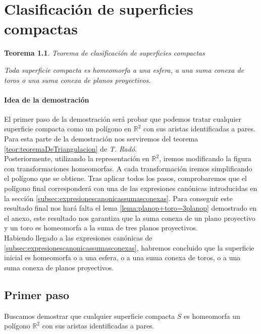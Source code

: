 \documentclass[a4paper,11pt,spanish, twoside, leqno]{tfg-uam}
\newcommand*{\reales}{\mathbb{R}}
\newtheorem{teor}{Teorema}[chapter]
\theoremstyle{definition}
\begin{document}
\chapter{Clasificación de superficies compactas}

\begin{teor}{Teorema de clasificación de superficies compactas}\label{teor:teoremadeclasificacion}
	
	Toda superficie compacta es homeomorfa a una esfera, a una suma conexa de toros o una suma conexa de planos proyectivos.
\end{teor}

\subsubsection*{Idea de la demostración}
El primer paso de la demostración será probar que podemos tratar cualquier superficie compacta como un polígono en $\reales^2$ con sus aristas identificadas a pares. Para esta parte de la demostración nos serviremos del teorema \ref{teor:teoremaDeTriangulacion} de \textit{T. Radó}.\\
Posteriormente, utilizando la representación en $\reales^2$, iremos modificando la figura con transformaciones homeomorfas. A cada transformación iremos simplificando el polígono que se obtiene. Tras aplicar todos los pasos, comprobaremos que el polígono final corresponderá con una de las expresiones canónicas introducidas en la sección \ref{subsec:expresionescanonicassumasconexas}. Para conseguir este resultado final nos hará falta el lema \ref{lema:planop+toro=3planop} demostrado en el anexo, este resultado nos garantiza que la suma conexa de un plano proyectivo y un toro es homeomorfa a la suma de tres planos proyectivos.\\
Habiendo llegado a las expresiones canónicas de \ref{subsec:expresionescanonicassumasconexas}, habremos concluido que la superficie inicial es homeomorfa o a una esfera, o a una suma conexa de toros, o a una suma conexa de planos proyectivos.\\

\section{Primer paso}
Buscamos demostrar que cualquier superficie compacta $S$ es homeomorfa un polígono $\reales^2$ con sus aristas identificadas a pares.
\\
\end{document}
